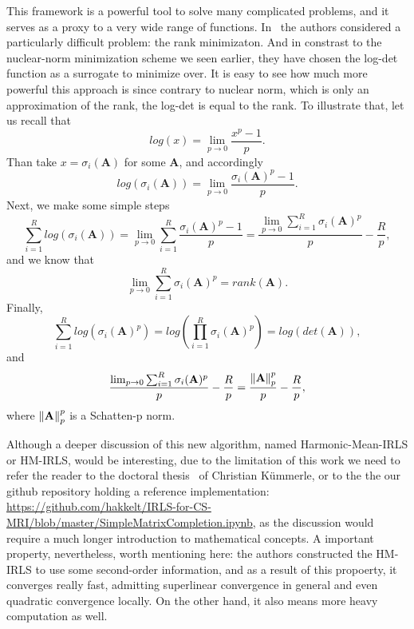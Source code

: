This framework is a powerful tool to solve many complicated problems, and it serves as a proxy to a very wide range of functions. In~\cite{kummerle_denoising_2018, kummerle_understanding_nodate} the authors considered a particularly difficult problem: the rank minimizaton. And in constrast to the nuclear-norm minimization scheme we seen earlier, they have chosen the log-det function as a surrogate to minimize over. It is easy to see how much more powerful this approach is since contrary to nuclear norm, which is only an approximation of the rank, the log-det is equal to the rank. To illustrate that, let us recall that
\[log(x) = \lim_{p \rightarrow 0} \frac{x^p - 1}{p}.\]
Than take $x = \sigma_i(\mathbf{A})$ for some $\mathbf{A}$, and accordingly
\[log(\sigma_i(\mathbf{A})) = \lim_{p \rightarrow 0} \frac{\sigma_i(\mathbf{A})^p - 1}{p}.\]
Next, we make some simple steps
\[\sum_{i=1}^R log(\sigma_i(\mathbf{A})) = \lim_{p \rightarrow 0} \sum_{i=1}^R \frac{\sigma_i(\mathbf{A})^p - 1}{p} =  \frac{\lim_{p \rightarrow 0} \sum_{i=1}^R \sigma_i(\mathbf{A})^p}{p} - \frac{R}{p},\]
and we know that
\[ \lim_{p \rightarrow 0} \sum_{i=1}^R \sigma_i(\mathbf{A})^p = rank(\mathbf{A}).\]
Finally,
\[\sum_{i=1}^R log(\sigma_i(\mathbf{A})^p) = log(\prod_{i=1}^R \sigma_i(\mathbf{A})^p) = log(det(\mathbf{A})),\]
and
\[\frac{\lim_{p \rightarrow 0} \sum_{i=1}^R \sigma_i(\mathbf{A})^p}{p} - \frac{R}{p} = \frac{\left\lVert\mathbf{A}\right\rVert_p^p}{p} - \frac{R}{p},\]
where $\left\lVert\mathbf{A}\right\rVert_p^p$ is a Schatten-p norm.

Although a deeper discussion of this new algorithm, named Harmonic-Mean-IRLS or HM-IRLS, would be interesting, due to the limitation of this work we need to refer the reader to the doctoral thesis~\cite{kummerle_understanding_nodate} of Christian Kümmerle, or to the the our github repository holding a reference implementation:
\url{https://github.com/hakkelt/IRLS-for-CS-MRI/blob/master/SimpleMatrixCompletion.ipynb}, as the discussion would require a much longer introduction to mathematical concepts. A important property, nevertheless, worth mentioning here: the authors constructed the HM-IRLS to use some second-order information, and as a result of this propoerty, it converges really fast, admitting superlinear convergence in general and even quadratic convergence locally. On the other hand, it also means more heavy computation as well.

